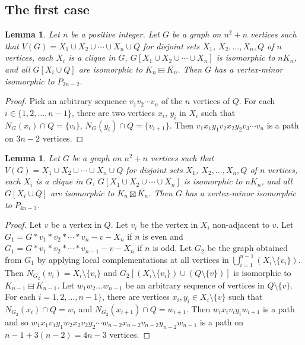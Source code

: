 \documentclass[11pt]{article}
\newtheorem{lemma}[theorem]{Lemma}
\newcommand\mat{\boxminus}
\newcommand\antimat{\boxtimes}
\def\S_#1{\overline{K_{#1}}}
\begin{document}
      \subsection{The first case}\label{subsec:starmatching}
      \begin{lemma}\label{lem:first1}
        Let $n$ be a positive integer.
        Let $G$ be a graph on $n^2+n$ vertices such that 
        $V(G)=X_1\cup X_2\cup\cdots \cup X_n\cup Q$
        for disjoint sets $X_1$, $X_2,\ldots, X_n,Q$ of $n$ vertices,
        each $X_i$ is a clique in $G$,
        $G[X_1\cup X_2\cup \cdots \cup X_n]$ is isomorphic to $nK_n$,
        and all $G[X_i\cup Q]$ are isomorphic to  $K_n\mat \S_n$.
        Then $G$ has a vertex-minor isomorphic to $P_{3n-2}$.
      \end{lemma}
      \begin{proof}
        Pick an arbitrary sequence $v_1v_2\cdots v_n$ of the $n$ vertices of $Q$.
        For each $i\in\{1,2,\ldots,n-1\}$, there are two vertices $x_i$, $y_i$ in $X_i$ such that
        $N_G(x_i)\cap Q=\{v_i\}$, $N_G(y_i)\cap Q=\{v_{i+1}\}$.
        Then $v_1x_1y_1v_2x_2y_2v_3\cdots v_n$ is a path on $3n-2$ vertices.
      \end{proof}
      \begin{lemma}\label{lem:first2}
        Let $G$ be a graph on $n^2+n$ vertices such that 
        $V(G)=X_1\cup X_2\cup\cdots \cup X_n\cup Q$
        for disjoint sets $X_1$, $X_2,\ldots, X_n,Q$ of $n$ vertices,
        each $X_i$ is a clique in $G$,
        $G[X_1\cup X_2\cup \cdots \cup X_n]$ is isomorphic to $nK_n$,
        and all $G[X_i\cup Q]$ are isomorphic to  $K_n\antimat \S_n$.
        Then $G$ has a vertex-minor isomorphic to $P_{4n-3}$.
      \end{lemma}
      \begin{proof}
        Let $v$ be a vertex in $Q$.
        Let $v_i$ be the vertex in $X_i$ non-adjacent to $v$.
        Let $G_1=G*v_1*v_2*\cdots*v_n-v-X_n$ if $n$ is even
        and $G_1=G*v_1*v_2*\cdots*v_{n-1}-v-X_n$ if $n$ is odd.
        Let $G_2$ be the graph obtained from $G_1$ by applying local complementations at all vertices in $\bigcup_{i=1}^{n-1} (X_i\setminus\{v_i\})$.
        Then $N_{G_2}(v_i)=X_i\setminus \{v_i\}$ and $G_2[(X_i\setminus\{v_i\})\cup (Q\setminus \{v\})]$ is isomorphic to $\S_{n-1}\mat \S_{n-1}$.
        Let $w_1w_2\ldots w_{n-1}$ be an arbitrary sequence of vertices in $Q\setminus\{v\}$.
        For each $i=1,2,\ldots,n-1\}$, there are vertices $x_i,y_i\in X_i\setminus\{v\}$
        such that $N_{G_2}(x_i)\cap Q=w_i$ and $N_{G_2}(x_{i+1})\cap Q=w_{i+1}$.
        Then $w_ix_iv_iy_iw_{i+1}$ is a path and so 
        $w_1x_1v_1y_1w_2x_2v_2y_2\cdots w_{n-2}x_{n-2}v_{n-2}y_{n-2}w_{n-1}$
        is a path on $n-1+3(n-2)=4n-3$ vertices.
      \end{proof}
      
\end{document}
